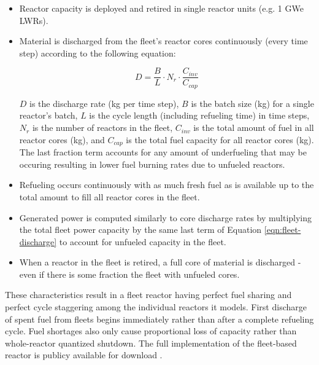 \documentclass{style}
\begin{document}
\begin{itemize}

    \item Reactor capacity is deployed and retired in single reactor units
        (e.g. 1 GWe LWRs).

    \item Material is discharged from the fleet's reactor cores continuously
        (every time step) according to the following equation:

        \begin{equation}
            D =
            \frac{B}{L} \cdot N_{r} \cdot \frac{C_{inv}}{C_{cap}}
            \label{eqn:fleet-discharge}
        \end{equation}

        $D$ is the discharge rate (kg per time step), $B$ is the batch size
        (kg) for a single reactor's batch, $L$ is the cycle length (including
        refueling time) in time steps, $N_{r}$ is the number of
        reactors in the fleet, $C_{inv}$ is the total amount of fuel in all
        reactor cores (kg), and $C_{cap}$ is the total fuel capacity for all
        reactor cores (kg).  The last fraction term accounts for any amount of
        underfueling that may be occuring resulting in lower fuel burning
        rates due to unfueled reactors.

    \item Refueling occurs continuously with as much fresh fuel as is
        available up to the total amount to fill all reactor cores in the
        fleet.

    \item Generated power is computed similarly to core discharge rates by
        multiplying the total fleet power capacity by the same last term of
        Equation \ref{eqn:fleet-discharge} to account for unfueled capacity in
        the fleet.

    \item When a reactor in the fleet is retired, a full core of material is
        discharged - even if there is some fraction the fleet with unfueled
        cores.
        
\end{itemize}

These characteristics result in a fleet reactor having perfect fuel sharing
and perfect cycle staggering among the individual reactors it models.  First
discharge of spent fuel from fleets begins immediately rather than after a
complete refueling cycle. Fuel shortages also only cause proportional loss of
capacity rather than whole-reactor quantized shutdown.  The full
implementation of the fleet-based reactor is publicy available for download
\cite{Carlsen2015}.
\end{document}

